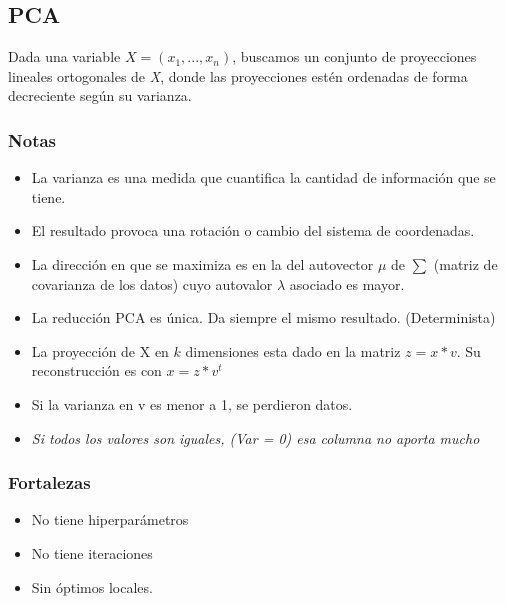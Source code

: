 \documentclass[titlepage,a4paper]{article}
\begin{document}
\subsection{PCA}

Dada una variable \begin{math} X = (x_1,...,x_n) \end{math}, buscamos un conjunto de proyecciones lineales ortogonales de \textit{X}, donde las proyecciones estén ordenadas de forma decreciente según su varianza.

\subsubsection*{Notas}
\begin{itemize}

\item La varianza es una medida que cuantifica la cantidad de información que se tiene.

\item El resultado provoca una rotación o cambio del sistema de coordenadas.

\item La dirección en que se maximiza es en la del autovector $\mu$ de $\sum$ (matriz de covarianza de los datos) cuyo autovalor $\lambda$ asociado es mayor.

\item La reducción PCA es única. Da siempre el mismo resultado. (Determinista)

\item La proyección de X en $k$ dimensiones esta dado en la matriz $z = x * v$. Su reconstrucción es con $x = z * v^{t}$

\item Si la varianza en v es menor a 1, se perdieron datos.

\item \textit{Si todos los valores son iguales, (Var = 0) esa columna no aporta mucho}

\end{itemize}

\subsubsection*{Fortalezas}
\begin{itemize}
    \item No tiene hiperparámetros
    \item No tiene iteraciones
    \item Sin óptimos locales.
\end{itemize}
\end{document}
